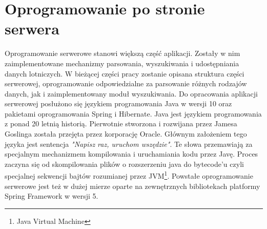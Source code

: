 \documentclass[12pt, twoside]{report}
\begin{document}
\section{Oprogramowanie po stronie serwera}
Oprogramowanie serwerowe stanowi większą część aplikacji. Zostały w nim zaimplementowane mechanizmy parsowania, wyszukiwania i udostępniania danych lotniczych. W bieżącej części pracy zostanie opisana struktura części serwerowej, oprogramowanie odpowiedzialne za parsowanie różnych rodzajów danych, jak i zaimplementowany moduł wyszukiwania.
Do opracowania aplikacji serwerowej posłużono się językiem programowania Java w wersji 10 oraz pakietami oprogramowania Spring i Hibernate. Java jest językiem programowania z ponad 20 letnią historią. Pierwotnie stworzona i rozwijana przez Jamesa Goslinga została przejęta przez korporację Oracle. Głównym założeniem tego języka jest sentencja \textit{"Napisz raz, uruchom wszędzie"}. Te słowa przemawiają za specjalnym mechanizmem kompilowania i uruchamiania kodu przez Javę. Proces zaczyna się od skompilowania plików o rozszerzeniu java do bytecode'u czyli specjalnej sekwencji bajtów rozumianej przez JVM\footnote{Java Virtual Machine}.\cite{jvm}
Powstałe oprogramowanie serwerowe jest też w dużej mierze oparte na zewnętrznych bibliotekach platformy Spring Framework w wersji 5.
\end{document}
